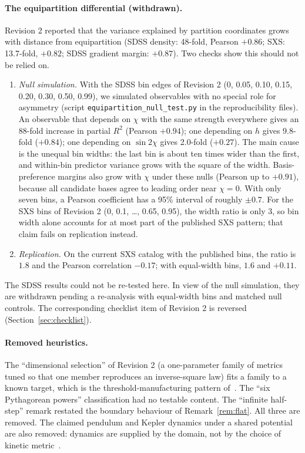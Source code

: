 \documentclass[11pt]{article}
\theoremstyle{definition}
\theoremstyle{remark}
\begin{document}
\paragraph{The equipartition differential (withdrawn).} Revision 2 reported that the variance
explained by partition coordinates grows with distance from equipartition (SDSS density:
48-fold, Pearson $+0.86$; SXS: 13.7-fold, $+0.82$; SDSS gradient margin: $+0.87$). Two checks
show this should not be relied on.
\begin{enumerate}\sloppy
\item \emph{Null simulation.} With the SDSS bin edges of Revision 2 (0, 0.05, 0.10, 0.15,
0.20, 0.30, 0.50, 0.99), we simulated observables with no special role for asymmetry
(script \texttt{equipartition\_null\_test.py} in the reproducibility files). An observable that depends on $\chi$ with the same
strength everywhere gives an 88-fold increase in partial $R^2$ (Pearson $+0.94$); one
depending on $h$ gives 9.8-fold ($+0.84$); one depending on $\sin 2\chi$ gives 2.0-fold
($+0.27$). The main cause is the unequal bin widths: the last bin is about ten times wider
than the first, and within-bin predictor variance grows with the square of the width.
Basis-preference margins also grow with $\chi$ under these nulls (Pearson up to $+0.91$),
because all candidate bases agree to leading order near $\chi=0$. With only seven bins, a
Pearson coefficient has a 95\% interval of roughly $\pm0.7$. For the SXS bins of Revision 2 (0, 0.1, \dots, 0.65, 0.95), the width ratio is only 3, so bin width alone accounts for at most
part of the published SXS pattern; that claim fails on replication instead.
\item \emph{Replication.} On the current SXS catalog with the published bins, the ratio is
$1.8$ and the Pearson correlation $-0.17$; with equal-width bins, $1.6$ and $+0.11$.
\end{enumerate}
The SDSS results could not be re-tested here. In view of the null simulation, they are
withdrawn pending a re-analysis with equal-width bins and matched null controls. The
corresponding checklist item of Revision 2 is reversed (Section~\ref{sec:checklist}).

\paragraph{Removed heuristics.} The ``dimensional selection'' of Revision 2 (a one-parameter
family of metrics tuned so that one member reproduces an inverse-square law) fits a family to
a known target, which is the threshold-manufacturing pattern of~\cite{DeJesus2026CG}. The
``six Pythagorean powers'' classification had no testable content. The ``infinite half-step''
remark restated the boundary behaviour of Remark~\ref{rem:flat}. All three are removed. The
claimed pendulum and Kepler dynamics under a shared potential are also removed: dynamics are
supplied by the domain, not by the choice of kinetic metric~\cite{DeJesus2026EP}.
\end{document}
